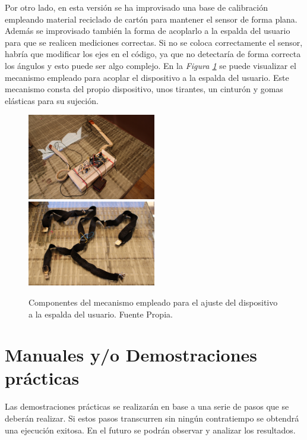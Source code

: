 Por otro lado, en esta versión se ha improvisado una base de calibración empleando material reciclado de cartón para mantener el sensor de forma plana. Además se improvisado también la forma de acoplarlo a la espalda del usuario para que se realicen mediciones correctas. Si no se coloca correctamente el sensor, habría que modificar los ejes en el código, ya que no detectaría de forma correcta los ángulos y esto puede ser algo complejo. En la \textit{Figura \ref{fig:imgMecanismoAjuste}} se puede visualizar el mecanismo empleado para acoplar el dispositivo a la espalda del usuario. Este mecanismo consta del propio dispositivo, unos tirantes, un cinturón y gomas elásticas para su sujeción.
\begin{figure}[h!]
    \centering
    \includegraphics[width=0.5\textwidth]{img/PlacaArd_V2_2.jpg}
    \includegraphics[width=0.5\textwidth]{img/TirantesProt.jpg}
    \caption{Componentes del mecanismo empleado para el ajuste del dispositivo a la espalda del usuario. Fuente Propia.}
    \label{fig:imgMecanismoAjuste} 
\end{figure}

\newpage
\section{Manuales y/o Demostraciones prácticas}

Las demostraciones prácticas se realizarán en base a una serie de pasos que se deberán realizar. Si estos pasos transcurren sin ningún contratiempo se obtendrá una ejecución exitosa. En el futuro se podrán observar y analizar los resultados.

